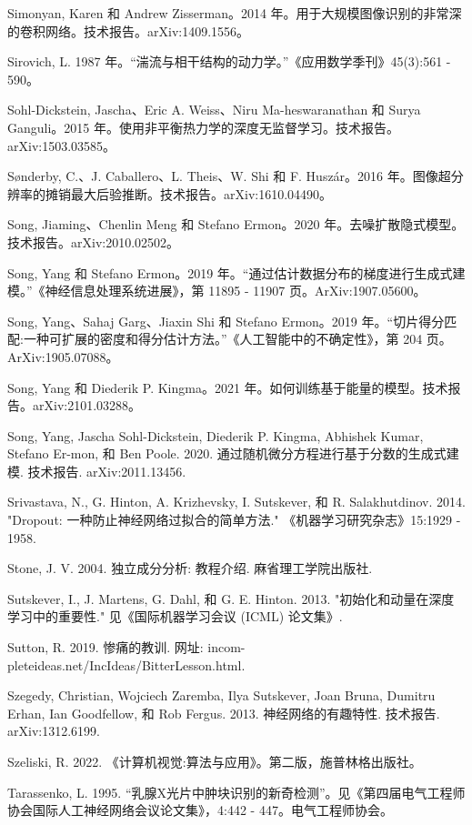 \documentclass[10pt]{article}
\begin{document}
Simonyan, Karen 和 Andrew Zisserman。2014 年。用于大规模图像识别的非常深的卷积网络。技术报告。arXiv:1409.1556。

Sirovich, L. 1987 年。“湍流与相干结构的动力学。”《应用数学季刊》45(3):561 - 590。

Sohl-Dickstein, Jascha、Eric A. Weiss、Niru Ma-heswaranathan 和 Surya Ganguli。2015 年。使用非平衡热力学的深度无监督学习。技术报告。arXiv:1503.03585。

Sønderby, C.、J. Caballero、L. Theis、W. Shi 和 F. Huszár。2016 年。图像超分辨率的摊销最大后验推断。技术报告。arXiv:1610.04490。

Song, Jiaming、Chenlin Meng 和 Stefano Ermon。2020 年。去噪扩散隐式模型。技术报告。arXiv:2010.02502。

Song, Yang 和 Stefano Ermon。2019 年。“通过估计数据分布的梯度进行生成式建模。”《神经信息处理系统进展》，第 11895 - 11907 页。ArXiv:1907.05600。

Song, Yang、Sahaj Garg、Jiaxin Shi 和 Stefano Ermon。2019 年。“切片得分匹配:一种可扩展的密度和得分估计方法。”《人工智能中的不确定性》，第 204 页。ArXiv:1905.07088。

Song, Yang 和 Diederik P. Kingma。2021 年。如何训练基于能量的模型。技术报告。arXiv:2101.03288。

Song, Yang, Jascha Sohl-Dickstein, Diederik P. Kingma, Abhishek Kumar, Stefano Er-mon, 和 Ben Poole. 2020. 通过随机微分方程进行基于分数的生成式建模. 技术报告. arXiv:2011.13456.

Srivastava, N., G. Hinton, A. Krizhevsky, I. Sutskever, 和 R. Salakhutdinov. 2014. "Dropout: 一种防止神经网络过拟合的简单方法." 《机器学习研究杂志》15:1929 - 1958.

Stone, J. V. 2004. 独立成分分析: 教程介绍. 麻省理工学院出版社.

Sutskever, I., J. Martens, G. Dahl, 和 G. E. Hinton. 2013. "初始化和动量在深度学习中的重要性." 见《国际机器学习会议 (ICML) 论文集》.

Sutton, R. 2019. 惨痛的教训. 网址: incom-pleteideas.net/IncIdeas/BitterLesson.html.

Szegedy, Christian, Wojciech Zaremba, Ilya Sutskever, Joan Bruna, Dumitru Erhan, Ian Goodfellow, 和 Rob Fergus. 2013. 神经网络的有趣特性. 技术报告. arXiv:1312.6199.

Szeliski, R. 2022. 《计算机视觉:算法与应用》。第二版，施普林格出版社。

Tarassenko, L. 1995. “乳腺X光片中肿块识别的新奇检测”。见《第四届电气工程师协会国际人工神经网络会议论文集》，4:442 - 447。电气工程师协会。
\end{document}
